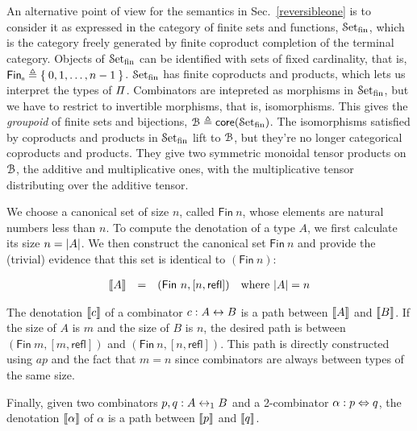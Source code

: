An alternative point of view for the semantics in Sec.~\ref{reversibleone} is to consider it  as expressed in the
category of finite sets and functions, $\SetFin$, which is the category freely generated by finite coproduct completion
of the terminal category. Objects of $\SetFin$ can be identified with sets of fixed cardinality, that is,
$\Fin[n] \defeq \Set{0,1,\ldots,n-1}$. $\SetFin$ has finite coproducts and products, which lets us interpret the types
of $\mathit{\Pi}$. Combinators are intepreted as morphisms in $\SetFin$, but we have to restrict to invertible morphisms,
that is, isomorphisms. This gives the \emph{groupoid} of finite sets and bijections,
$\BFin \defeq \mathsf{core}(\SetFin)$. The isomorphisms satisfied by coproducts and products in $\SetFin$ lift to
$\BFin$, but they're no longer categorical coproducts and products. They give two symmetric monoidal tensor products on
$\BFin$, the additive and multiplicative ones, with the multiplicative tensor distributing over the additive tensor.

We choose a canonical set of size $n$, called $\mathsf{Fin}~n$, whose elements are natural numbers less than $n$. To
compute the denotation of a type $A$, we first calculate its size $n = | A |$. We then construct the canonical set
$\mathsf{Fin}~n$ and provide the (trivial) evidence that this set is identical to $(\mathsf{Fin}~n)$:

\[\begin{array}{rcll}
\llbracket A \rrbracket &=& (\mathsf{Fin}~n, [ n , \mathsf{refl} ]) & \mbox{where}~| A | = n
\end{array}\]

\noindent The denotation $\llbracket c \rrbracket$ of a combinator $c : A \leftrightarrow B$ is a path between $\llbracket A \rrbracket$ and $\llbracket B \rrbracket$. If the
size of $A$ is $m$ and the size of $B$ is $n$, the desired path is between $(\mathsf{Fin}~m, [ m , \mathsf{refl} ])$ and
$(\mathsf{Fin}~n, [ n , \mathsf{refl} ])$. This path is directly constructed using $\mathit{ap}$ and the fact that $m=n$
since combinators are always between types of the same size.

\noindent Finally, given two combinators $p , q : A \leftrightarrow_1 B$ and a 2-combinator $\alpha : p \mathrel{\Leftrightarrow} q$, the denotation
$\llbracket \alpha \rrbracket$ of $\alpha$ is a path between $\llbracket p \rrbracket$ and $\llbracket q \rrbracket$.


